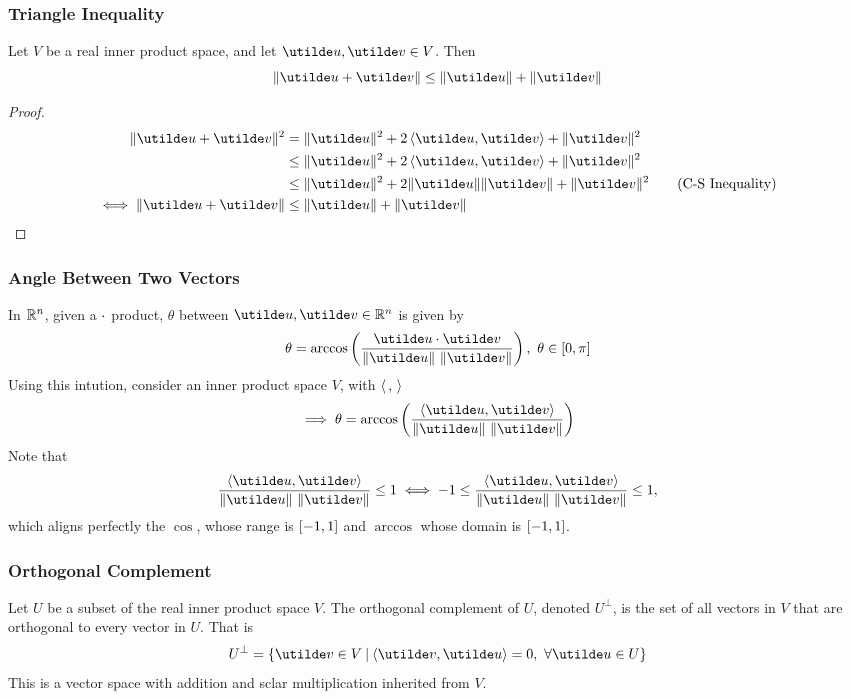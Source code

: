 \documentclass{report}
\begin{document}
\subsubsection{Triangle Inequality}
Let $V$ be a real inner product space, and let $\ut{u},\ut{v}\in V$. Then
$$
  \norm{\ut{u} + \ut{v}} \leq \norm{\ut{u}} + \norm{\ut{v}}
$$
\begin{proof}
  \begin{align*}
    \norm{\ut{u} + \ut{v}}^2 &= \norm{\ut{u}}^2 + 2\brangle{\ut{u},\ut{v}} + \norm{\ut{v}}^2 \\
      &\leq \norm{\ut{u}}^2 + 2\brangle{\ut{u},\ut{v}} + \norm{\ut{v}}^2 \\
      &\leq \norm{\ut{u}}^2 + 2\norm{\ut{u}}\norm{\ut{v}} + \norm{\ut{v}}^2 \tag*{(\text{C-S Inequality})} \\
    \iff \norm{\ut{u} + \ut{v}} &\leq \norm{\ut{u}} + \norm{\ut{v}}
  \end{align*}
\end{proof}

\subsubsection{Angle Between Two Vectors}
In $\mathbb{R}^n$, given a $\cdot$ product, $\theta$ between $\ut{u},\ut{v}\in\bbr^n$ is given by
$$
  \theta = \arccos\bracks{\frac{\ut{u}\cd\ut{v}}{\norm{\ut{u}}\ \norm{\ut{v}}}},\ \theta\in\sqbracks{0,\pi}
$$
Using this intution, consider an inner product space $V$, with $\left\langle \, ,\, \right\rangle$
$$
  \implies \theta = \arccos\bracks{\frac{\brangle{\ut{u},\ut{v}}}{\norm{\ut{u}}\ \norm{\ut{v}}}}
$$
Note that
$$
  \frac{\brangle{\ut{u},\ut{v}}}{\norm{\ut{u}}\ \norm{\ut{v}}} \leq 1 \iff -1 \leq \frac{\brangle{\ut{u},\ut{v}}}{\norm{\ut{u}}\ \norm{\ut{v}}} \leq 1,
$$
which aligns perfectly the $\cos$, whose range is $\left[ -1,1 \right]$ and $\arccos$ whose domain is $\left[ -1,1 \right]$.

\subsubsection{Orthogonal Complement}
Let $U$ be a subset of the real inner product space $V$. The orthogonal complement of $U$, denoted $U^\perp$, is the set of all vectors in $V$ that are orthogonal to every vector in $U$. That is 
$$
  U^\perp = \braces{\ut{v}\in V \suchthat \brangle{\ut{v},\ut{u}} = 0,\ \forall\ut{u}\in U}
$$
This is a vector space with addition and sclar multiplication inherited from $V$.
\end{document}
